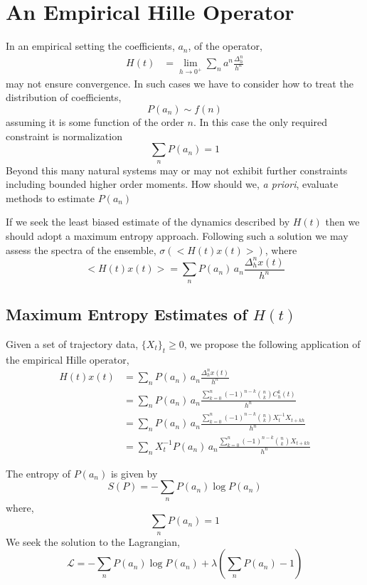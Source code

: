 \documentclass{article}
\newcommand{\Lgr}{\mathcal{L}}
\begin{document}
\section{An Empirical Hille Operator}
In an empirical setting the coefficients, $a_n$, of the operator,
\begin{align*}
    H(t) &= \lim_{h\rightarrow0^+} \sum_n a^n \frac{\Delta^n_h}{h^n}
\end{align*}
may not ensure convergence. In such cases we have to consider how to treat the distribution of coefficients, 
$$
    P(a_n) \sim f(n)
$$
assuming it is some function of the order $n$. In this case the only required constraint is normalization
$$
\sum_n P(a_n) = 1
$$
Beyond this many natural systems may or may not exhibit further constraints including bounded higher order moments. How should we, \textit{a priori}, evaluate methods to estimate $P(a_n)$ 

If we seek the least biased estimate of the dynamics described by $H(t)$ then we should adopt a maximum entropy approach. Following such a solution we may assess the spectra of the ensemble, $\sigma(<H(t)x(t)>)$, where
$$
    <H(t) x(t) > = \sum_n P(a_n)\, a_n \frac{\Delta^n_h x(t)}{h^n}
$$

\subsection{Maximum Entropy Estimates of $H(t)$}
Given a set of trajectory data, $\{X_t\}_t\geq0$, we propose the following application of the empirical Hille operator,
\begin{align*}
    H(t)x(t) &= \sum_n P(a_n) \, a_n \frac{\Delta^n_h x(t)}{h^n}\\
    &= \sum_{n} P(a_n) \, a_n \frac{ \sum_{k=0}^n (-1)^{n-k} {n \choose k} C_h^k(t)}{h^n}\\
    &= \sum_{n} P(a_n) \, a_n \frac{ \sum_{k=0}^n (-1)^{n-k} {n \choose k} X_t^{-1} X_{t+kh}}{h^n}\\
    &= \sum_{n} X_t^{-1} P(a_n) \, a_n  \frac{ \sum_{k=0}^n (-1)^{n-k} {n \choose k} X_{t+kh}}{h^n}
\end{align*}

The entropy of $P(a_n)$ is given by
$$
    S(P) = - \sum_n P(a_n) \log P(a_n)
$$
where,
$$
    \sum_n P(a_n) = 1
$$
We seek the solution to the Lagrangian,
$$
     \Lgr = -\sum_n P(a_n) \log P(a_n) + \lambda \left( \sum_n P(a_n) -1\right)
$$
\end{document}
